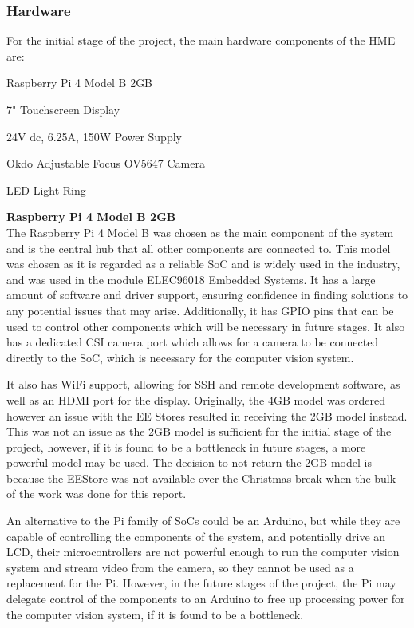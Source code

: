 \subsubsection{Hardware} \label{sec:hardware}
For the initial stage of the project, the main hardware components of the HME are:
\begin{mylist}
  \item Raspberry Pi 4 Model B 2GB\cite{pi4}
  \item 7" Touchscreen Display\cite{7inchdisplay}
  \item 24V dc, 6.25A, 150W Power Supply
  \item Okdo Adjustable Focus OV5647 Camera\cite{okdocamera}
  \item LED Light Ring
\end{mylist}
\textbf{Raspberry Pi 4 Model B 2GB} \\
The Raspberry Pi 4 Model B was chosen as the main component of the system and is the central hub that all other components are connected to.
This model was chosen as it is regarded as a reliable SoC and is widely used in the industry, and was used in the module ELEC96018 Embedded Systems.
It has a large amount of software and driver support, ensuring confidence in finding solutions to any potential issues that may arise. Additionally, 
it has GPIO pins that can be used to control other components which will be necessary in future stages. It also has a 
dedicated CSI camera port which allows for a camera to be connected directly to the SoC, which is necessary for the computer vision system.

It also has WiFi support, allowing for SSH and remote development software, as well as an HDMI port for the display.
Originally, the 4GB model was ordered however an issue with the EE Stores resulted in receiving the 2GB model instead.
This was not an issue as the 2GB model is sufficient for the initial stage of the project, however, if it is found to be a bottleneck
in future stages, a more powerful model may be used. The decision to not return the 2GB model is because the EEStore was not
available over the Christmas break when the bulk of the work was done for this report.

An alternative to the Pi family of SoCs could be an Arduino, but while they are capable of controlling the components of the system,
and potentially drive an LCD, their microcontrollers are not powerful enough to run the computer vision system and stream video from the camera,
so they cannot be used as a replacement for the Pi. However, in the future stages of the project, the Pi may delegate control of the components to an Arduino
to free up processing power for the computer vision system, if it is found to be a bottleneck.

